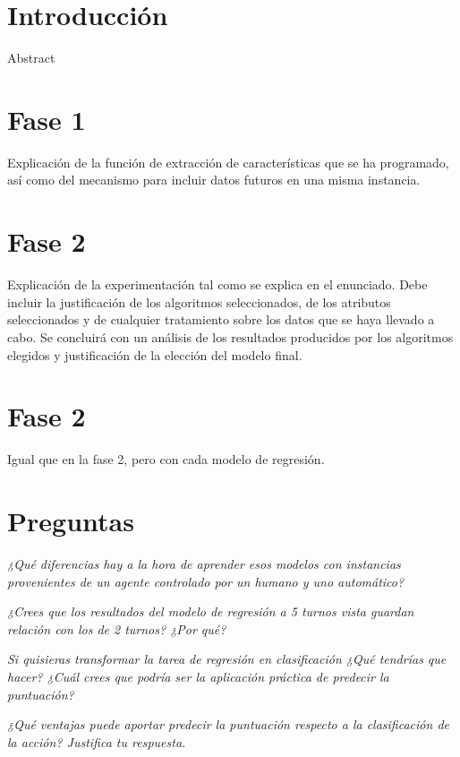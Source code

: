 \documentclass[12pt]{article}
\begin{document}
\tableofcontents

\newpage

\section*{Introducción}

\huge Abstract

\section{Fase 1}

Explicación de la función de extracción de características que se ha programado, así como del mecanismo para incluir datos futuros en una misma instancia.

\section{Fase 2}

Explicación de la experimentación tal como se explica en el enunciado. Debe incluir la justificación de los algoritmos seleccionados, de los atributos seleccionados y de cualquier tratamiento sobre los datos que se haya llevado a cabo. Se concluirá con un análisis de los resultados producidos por los algoritmos elegidos y justificación de la elección del modelo final.

\section{Fase 2}

Igual que en la fase 2, pero con cada modelo de regresión.

\section{Preguntas}

\emph{¿Qué diferencias hay a la hora de aprender esos modelos con instancias provenientes de un agente controlado por un humano y uno automático?}

\emph{¿Crees que los resultados del modelo de regresión a 5 turnos vista guardan relación con los de 2 turnos? ¿Por qué?}

\emph{Si quisieras transformar la tarea de regresión en clasificación ¿Qué tendrías que hacer? ¿Cuál crees que podría ser la aplicación práctica de predecir la puntuación?}

\emph{¿Qué ventajas puede aportar predecir la puntuación respecto a la clasificación de la acción? Justifica tu respuesta.}
\end{document}
